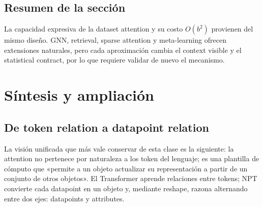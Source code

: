 \documentclass[a4paper]{article}
\begin{document}
\subsection{Resumen de la sección}

La capacidad expresiva de la dataset attention y su costo $O(b^2)$ provienen del mismo diseño. GNN, retrieval, sparse attention y meta-learning ofrecen extensiones naturales, pero cada aproximación cambia el context visible y el statistical contract, por lo que requiere validar de nuevo el mecanismo.
\section{Síntesis y ampliación}

\subsection{De token relation a datapoint relation}

La visión unificada que más vale conservar de esta clase es la siguiente: la attention no pertenece por naturaleza a los token del lenguaje; es una plantilla de cómputo que «permite a un objeto actualizar su representación a partir de un conjunto de otros objetos». El Transformer aprende relaciones entre tokens; NPT convierte cada datapoint en un objeto y, mediante reshape, razona alternando entre dos ejes: datapoints y attributes.
\end{document}

